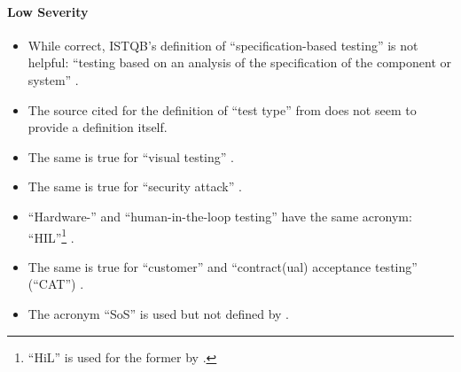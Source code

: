 \ifnotpaper
      \paragraph{Low Severity}
      \begin{itemize}
            \item %
                  While correct, ISTQB's definition of ``specification-based testing''
                  is not helpful: ``testing based on an analysis of the specification
                  of the component or system'' \citepISTQB{}.
            \item %
                  The source cited for the definition of ``test type'' from
                  \citepISTQB{} does not seem to provide a definition itself.
            \item %
                  The same is true for ``visual testing'' \citepISTQB{}.
            \item %
                  The same is true for ``security attack'' \citepISTQB{}.
            \item %
                  ``Hardware-'' and ``human-in-the-loop testing'' have the same
                  acronym: ``HIL''\footnote{``HiL'' is used for the former by
                        \citet[p.~2]{PreußeEtAl2012}.} \citep[p.~23]{Firesmith2015}.
            \item %
                  The same is true for ``customer'' and ``contract(ual) acceptance
                  testing'' (``CAT'') \citep[p.~30]{Firesmith2015}.
            \item %
                  The acronym ``SoS'' is used but not defined by
                  \citet[p.~23]{Firesmith2015}.
      \end{itemize}\fi